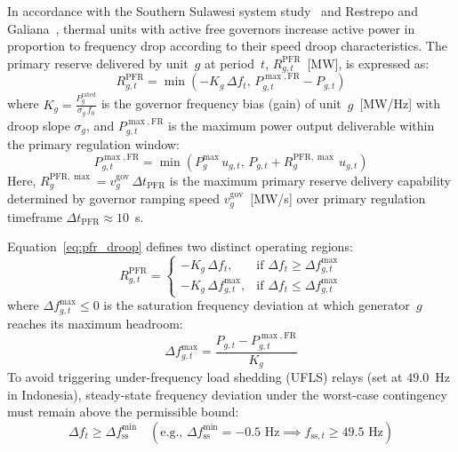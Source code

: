 \documentclass[journal]{IEEEtran}
\begin{document}
In accordance with the Southern Sulawesi system study~\cite{E02Sulawesi} and Restrepo and Galiana~\cite{Restrepo2005}, thermal units with active free governors increase active power in proportion to frequency drop according to their speed droop characteristics. The primary reserve delivered by unit~$g$ at period~$t$, $R_{g,t}^{\text{PFR}}$~[MW], is expressed as:
\begin{equation}
  R_{g,t}^{\text{PFR}} = \min\left(-K_g\,\Delta f_t, \, P_{g,t}^{\max,\text{FR}} - P_{g,t}\right)
  \label{eq:pfr_droop}
\end{equation}
where $K_g = \frac{P_g^{\text{rated}}}{\sigma_g\,f_0}$ is the governor frequency bias (gain) of unit~$g$~[MW/Hz] with droop slope $\sigma_g$, and $P_{g,t}^{\max,\text{FR}}$ is the maximum power output deliverable within the primary regulation window:
\begin{equation}
  P_{g,t}^{\max,\text{FR}} = \min\left(P_g^{\max}\,u_{g,t}, \, P_{g,t} + R_g^{\text{PFR},\max}\,u_{g,t}\right)
  \label{eq:p_max_fr}
\end{equation}
Here, $R_g^{\text{PFR},\max} = v_g^{\text{gov}}\,\Delta t_{\text{PFR}}$ is the maximum primary reserve delivery capability determined by governor ramping speed $v_g^{\text{gov}}$~[MW/s] over primary regulation timeframe $\Delta t_{\text{PFR}} \approx 10$~s.

Equation~\eqref{eq:pfr_droop} defines two distinct operating regions:
\begin{equation}
  R_{g,t}^{\text{PFR}} = 
  \begin{cases}
    -K_g\,\Delta f_t, & \text{if } \Delta f_t \geq \Delta f_{g,t}^{\max} \\[6pt]
    -K_g\,\Delta f_{g,t}^{\max}, & \text{if } \Delta f_t \leq \Delta f_{g,t}^{\max}
  \end{cases}
  \label{eq:pfr_piecewise}
\end{equation}
where $\Delta f_{g,t}^{\max} \leq 0$ is the saturation frequency deviation at which generator~$g$ reaches its maximum headroom:
\begin{equation}
  \Delta f_{g,t}^{\max} = \frac{P_{g,t} - P_{g,t}^{\max,\text{FR}}}{K_g}
  \label{eq:delta_f_max}
\end{equation}
To avoid triggering under-frequency load shedding (UFLS) relays (set at $49.0$~Hz in Indonesia), steady-state frequency deviation under the worst-case contingency must remain above the permissible bound:
\begin{equation}
  \Delta f_t \geq \Delta f_{\text{ss}}^{\min} \quad (\text{e.g., } \Delta f_{\text{ss}}^{\min} = -0.5\text{ Hz} \implies f_{\text{ss},t} \geq 49.5\text{ Hz})
  \label{eq:ss_freq_limit}
\end{equation}
\end{document}
